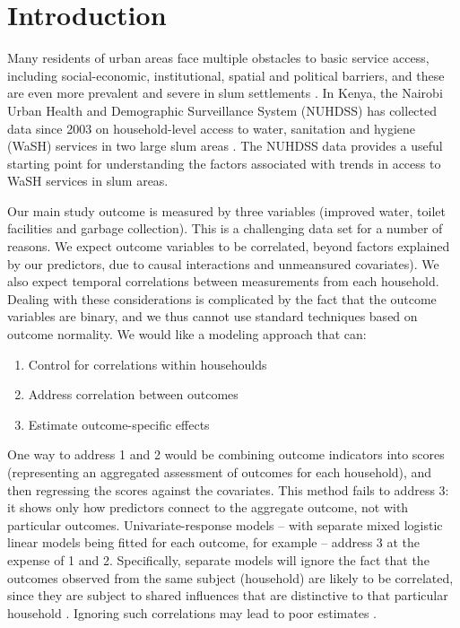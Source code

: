 \section*{Introduction}

Many residents of urban areas face multiple obstacles to basic service access, including social-economic, institutional, spatial and political barriers, and these are even more prevalent and severe in slum settlements \citep{pierce2017basic}. In Kenya, the Nairobi Urban Health and Demographic Surveillance System (NUHDSS) has collected data since 2003 on household-level access to water, sanitation and hygiene (WaSH) services in two large slum areas \citep{beguy2015health}. The NUHDSS data provides a useful starting point for understanding the factors associated with trends in access to WaSH services in slum areas.

Our main study outcome is measured by three variables (improved water, toilet facilities and garbage collection). This is a challenging data set for a number of reasons.
We expect outcome variables to be correlated, beyond factors explained by our predictors, due to causal interactions and unmeansured covariates). We also expect temporal correlations between measurements from each household. Dealing with these considerations is complicated by the fact that the outcome variables are binary, and we thus cannot use standard techniques based on outcome normality.
We would like a modeling approach that can: 
\begin{enumerate}
\item Control for correlations within househoulds
\item Address correlation between outcomes
\item Estimate outcome-specific effects
\end{enumerate}

One way to address 1 and 2 would be combining outcome indicators into scores (representing an aggregated assessment of outcomes for each household), and then regressing the scores against the covariates. This method fails to address 3: it shows only how predictors connect to the aggregate outcome, not with particular outcomes. Univariate-response models -- with separate mixed logistic linear models being fitted for each outcome, for example -- address 3 at the expense of 1 and 2. Specifically, separate models will ignore the fact that the outcomes observed from the same subject (household) are likely to be correlated, since they are subject to shared influences that are distinctive to that particular household \citep{lalonde2019disc}. Ignoring such correlations may lead to poor estimates \citep{dassimultaneous, fang2018joint, ivanova2016mixed, miro2004bayesian, lalonde2019disc}.

